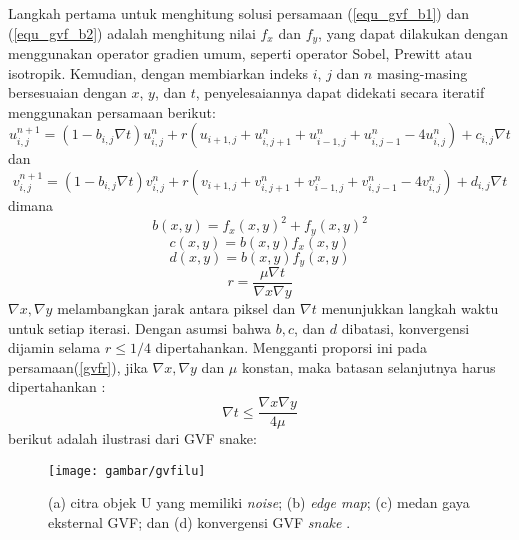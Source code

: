 Langkah pertama untuk menghitung solusi persamaan (\ref{equ_gvf_b1}) dan (\ref{equ_gvf_b2}) adalah menghitung nilai $f_x$ dan $f_y$, yang dapat dilakukan dengan menggunakan operator gradien umum, seperti operator Sobel, Prewitt atau isotropik. Kemudian, dengan membiarkan indeks $i$, $j$ dan $n$ masing-masing bersesuaian dengan $x$, $y$, dan $t$, penyelesaiannya dapat didekati secara iteratif menggunakan persamaan berikut\citep{CartasAyala2011GradientVF}:
\begin{equation}
	\label{gvfc1}
	u^{n+1}_{i,j} = (1 - b_{i,j} \nabla t) u^{n}_{i,j} + r ( u_{i+1 , j} + u^n_{i,j+1} + u^n_{i-1 , j} + u^n_{i, j-1} - 4u^n_{i, j}) + c_{i,j} \nabla t
\end{equation}
dan
\begin{equation}
	\label{gvfc2}
	v^{n+1}_{i,j} = (1 - b_{i,j} \nabla t) v^{n}_{i,j} + r ( v_{i+1 , j} + v^n_{i,j+1} + v^n_{i-1 , j} + v^n_{i, j-1} - 4v^n_{i, j}) + d_{i,j} \nabla t
\end{equation}
dimana
\begin{equation}
	\label{gvfnot1}
	b (x,y) = f_x(x,y)^2 + f_y(x,y)^2
\end{equation}
\begin{equation}
	\label{gvfnot2}
	c (x,y) = b(x,y)f_x(x,y)
\end{equation}
\begin{equation}
	\label{gvfnot3}
	d (x,y) = b(x,y)f_y(x,y)
\end{equation}
\begin{equation}
	\label{gvfr}
	r = \frac{\mu \nabla t}{\nabla x \nabla y}
\end{equation}
$\nabla x, \nabla y$ melambangkan jarak antara piksel dan $\nabla t$ menunjukkan langkah waktu untuk setiap iterasi. Dengan asumsi bahwa $b, c$, dan $d$ dibatasi, konvergensi dijamin selama $r \leq 1/4$ dipertahankan. Mengganti proporsi ini pada persamaan(\ref{gvfr}), jika $\nabla x, \nabla y$ dan $\mu$ konstan, maka batasan selanjutnya harus dipertahankan \citep{CartasAyala2011GradientVF}:
\begin{equation}
	\label{gvfnot5}
	\nabla t \leq \frac{\nabla x \nabla y}{4 \mu}
\end{equation}
berikut adalah ilustrasi dari GVF snake:
\begin{figure}[H]
	\centering
	\texttt{[image: gambar/gvfilu]}
	\caption{(a) citra objek U yang memiliki \emph{noise}; (b) \emph{edge map}; (c) medan gaya eksternal GVF; dan (d) konvergensi GVF \emph{snake} \citep{xu1998snakes:22}.}
	\label{Gambar:gvfilu}
\end{figure}


\begin{comment}
bibliography{daftar-pustaka}
\end{comment}
